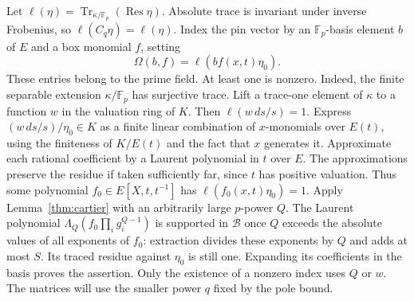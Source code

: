 \documentclass[11pt,letterpaper]{article}
\theoremstyle{definition}
\numberwithin{equation}{section}
\DeclareMathOperator{\Res}{Res}
\DeclareMathOperator{\Tr}{Tr}
\begin{document}
Let $\ell(\eta)=\Tr_{\kappa/\mathbb{F}_p}(\Res\eta)$. Absolute trace is invariant under inverse Frobenius, so
$\ell(C_q \eta)=\ell(\eta)$. Index the pin vector by an $\mathbb{F}_p$-basis element $b$ of $E$ and
a box monomial $f$,
setting
\[
  \Omega(b,f)=\ell(bf(x,t)\eta_0).
\]
These entries belong to the prime field. At least one is nonzero. Indeed, the finite separable
extension $\kappa/\mathbb{F}_p$ has surjective trace. Lift a trace-one element of $\kappa$ to a function $w$ in the
valuation ring of $K$. Then $\ell(w\,ds/s)=1$. Express $(w\,ds/s)/\eta_0\in K$ as a finite linear
combination of $x$-monomials over $E(t)$, using the finiteness of $K/E(t)$ and the fact that $x$
generates it. Approximate each rational coefficient by a Laurent polynomial in $t$ over $E$. The
approximations preserve the residue if taken sufficiently far, since $t$ has positive valuation.
Thus some polynomial $f_0 \in E[X,t,t^{-1}]$ has $\ell(f_0(x,t)\eta_0)=1$. Apply Lemma~\ref{thm:cartier} with an
arbitrarily large $p$-power $Q$. The Laurent polynomial $\Lambda_Q(f_0 \prod_i g_i^{Q-1})$ is
supported in $\mathcal{B}$ once
$Q$ exceeds the absolute values of all exponents of $f_0$: extraction divides these exponents by
$Q$ and adds at most $S$. Its traced residue against $\eta_0$ is still one. Expanding its coefficients
in the basis proves the assertion. Only the existence of a nonzero index uses $Q$ or $w$. The
matrices will use the smaller power $q$ fixed by the pole bound.
\end{document}
